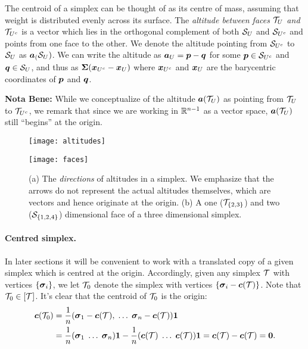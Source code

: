 The centroid of a simplex can be thought of as its centre of mass, assuming that weight is distributed evenly across its surface. The \emph{altitude between faces $\mathcal{T}_U$ and $\mathcal{T}_{U^c}$} is a vector which lies in the orthogonal complement of both $\mathcal{S}_U$ and $\mathcal{S}_{U^c}$ and points from one face to the other. 
We denote the altitude pointing from $\mathcal{S}_{U^c}$ to $\mathcal{S}_{U}$ as $\vb*{a}_(\mathcal{S}_U)$. We can write the altitude as $\vb*{a}_U=\vb*{p}-\vb*{q}$ for some $\vb*{p}\in \mathcal{S}_{U^c}$ and $\vb*{q}\in\mathcal{S}_{U}$, and thus as $\boldsymbol{\Sigma}(\vb*{x}_{U^c}-\vb*{x}_{U})$ where $\vb*{x}_{U^c}$ and $\vb*{x}_{U}$ are the barycentric coordinates of $\vb*{p}$ and $\vb*{q}$. 

\textbf{Nota Bene:} While  we conceptualize of the altitude $\vb*{a}(\mathcal{T}_U)$ as pointing from $\mathcal{T}_U$  to  $\mathcal{T}_{U^c}$, we  remark that since we are working in  $\mathbb{R}^{n-1}$  as  a vector  space,  $\vb*{a}(\mathcal{T}_U)$ still ``begins'' at  the origin. 

\begin{figure}
	\centering
	\begin{minipage}{0.45\textwidth}
	\centering
	\texttt{[image: altitudes]}
	\subcaption{ }
	\label{fig:altitudes}
	\end{minipage}
\hspace{0.08\textwidth}
\begin{minipage}{0.45\textwidth}
	\centering
	\texttt{[image: faces]}
	\subcaption{}
	\label{fig:faces}
\end{minipage}
\caption{(a) The \emph{directions} of altitudes in a simplex. We emphasize that the arrows do not represent the actual altitudes themselves, which  are  vectors and hence originate at the origin. (b) A one  ($\mathcal{T}_{\{2,3\}}$) and two ($\mathcal{S}_{\{1,2,4\}}$) dimensional face of a three dimensional simplex. }
\label{fig:faces+altitudes}
\end{figure}

\paragraph{Centred  simplex.}
In later sections it will be convenient to work with a translated copy of a given simplex which is centred at the origin. Accordingly, given any simplex $\mathcal{T}$ with vertices $\{\vb*{\sigma}_i\}$, we let $\mathcal{T}_0$ denote the simplex with vertices $\{\vb*{\sigma}_i - \vb*{c}(\mathcal{T})\}$. Note that $\mathcal{T}_0\in[\mathcal{T}]$. It's clear that the centroid of $\mathcal{T}_0$ is the origin: 
\begin{align*}
\vb*{c}(\mathcal{T}_0) 
&= \frac{1}{n}(\vb*{\sigma}_1-\vb*{c}(\mathcal{T}),\;\dots\;\vb*{\sigma}_n-\vb*{c}(\mathcal{T}))\vb{1} \\
&= \frac{1}{n}(\vb*{\sigma}_1\;\dots\;\vb*{\sigma}_n)\vb{1} - \frac{1}{n}(\vb*{c}(\mathcal{T})\;\dots\;\vb*{c}(\mathcal{T}))\vb{1} = \vb*{c}(\mathcal{T}) - \vb*{c}(\mathcal{T})=\vb{0}.
\end{align*}

